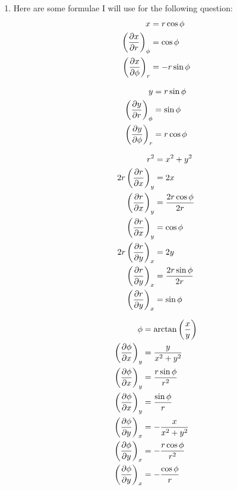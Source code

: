 \documentclass[10pt,\jkfside,a4paper]{article}
\begin{document}
\begin{enumerate}
\begin{enumerate}
\end{enumerate}

\item
\begin{enumerate}

Here are some formulae I will use for the following question:
\begin{equation}
\begin{split}
x &= r \cos \phi \\
\left(\pdv{x}{r}\right)_\phi &= \cos \phi \\
\left(\pdv{x}{\phi}\right)_r &= -r \sin \phi \\
\end{split}
\end{equation}

\begin{equation}
\begin{split}
y &= r \sin \phi \\
\left(\pdv{y}{r}\right)_\phi &= \sin \phi \\
\left(\pdv{y}{\phi}\right)_r &= r \cos \phi \\
\end{split}
\end{equation}

\begin{equation}
\begin{split}
r^2 &= x^2 + y^2 \\
2r\left(\pdv{r}{x}\right)_y &= 2x \\
\left(\pdv{r}{x}\right)_y &= \frac{2r \cos\phi}{2r} \\
\left(\pdv{r}{x}\right)_y &= \cos\phi \\
2r\left(\pdv{r}{y}\right)_x &= 2y \\
\left(\pdv{r}{y}\right)_x &= \frac{2r \sin\phi}{2r} \\
\left(\pdv{r}{y}\right)_x &= \sin\phi \\
\end{split}
\end{equation}

\begin{equation}
\begin{split}
\phi &= \arctan\left(\frac{x}{y}\right) \\
\left(\pdv{\phi}{x}\right)_y &= \frac{y}{x^2 + y^2} \\
\left(\pdv{\phi}{x}\right)_y &= \frac{r\sin \phi}{r^2} \\
\left(\pdv{\phi}{x}\right)_y &= \frac{\sin \phi}{r} \\
\left(\pdv{\phi}{y}\right)_x &= -\frac{x}{x^2 + y^2} \\
\left(\pdv{\phi}{y}\right)_x &= -\frac{r\cos \phi}{r^2} \\
\left(\pdv{\phi}{y}\right)_x &= -\frac{\cos \phi}{r} \\
\end{split}
\end{equation}


\end{enumerate}
\end{enumerate}
\end{document}
